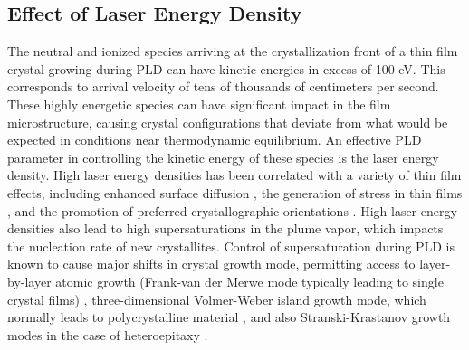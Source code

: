 \subsection{Effect of Laser Energy Density}
The neutral and ionized species arriving at the crystallization front of a thin film crystal growing during PLD can have kinetic energies in excess of 100 eV. This corresponds to arrival velocity of tens of thousands of centimeters per second. These highly energetic species can have significant impact in the film microstructure, causing crystal configurations that deviate from what would be expected in conditions near thermodynamic equilibrium. An effective PLD parameter in controlling the kinetic energy of these species is the laser energy density. High laser energy densities has been correlated with a variety of thin film effects, including enhanced surface diffusion \cite{Willmott2004}, the generation of stress in thin films \cite{Voevodin1996}, and the promotion of preferred crystallographic orientations \cite{Kim2007}. High laser energy densities also lead to high supersaturations in the plume vapor, which impacts the nucleation rate of new crystallites. Control of supersaturation during PLD is known to cause major shifts in crystal growth mode, permitting access to layer-by-layer atomic growth (Frank-van der Merwe mode typically leading to single crystal films) \cite{Ohtomo2005}, three-dimensional Volmer-Weber island growth mode, which normally leads to polycrystalline material \cite{Rao2014}, and also Stranski-Krastanov growth modes in the case of heteroepitaxy \cite{Norton2004,Weidenkaff2006}.

